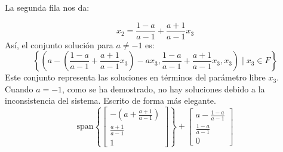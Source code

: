 \begin{solution}
La segunda fila nos da:

\[
x_2 = \frac{1-a}{a-1} + \frac{a+1}{a-1} x_3
\]
Así, el conjunto solución para $a \neq -1$ es:
\[
\left\{ \left( a - \left( \frac{1-a}{a-1} + \frac{a+1}{a-1} x_3 \right) - a x_3, \frac{1-a}{a-1} + \frac{a+1}{a-1} x_3, x_3 \right) \mid x_3 \in F \right\}
\]
Este conjunto representa las soluciones en términos del parámetro libre $x_3$. Cuando $a=-1$, como se ha demostrado, no hay soluciones debido a la inconsistencia del sistema. Escrito de forma más elegante.
\[
\text{span}\left\{
\begin{bmatrix}
-\left(a + \frac{a+1}{a-1}\right) \\
\frac{a+1}{a-1} \\
1
\end{bmatrix}
\right\} + 
\begin{bmatrix}
a - \frac{1-a}{a-1} \\
\frac{1-a}{a-1} \\
0
\end{bmatrix}
\]
    
\end{solution}
